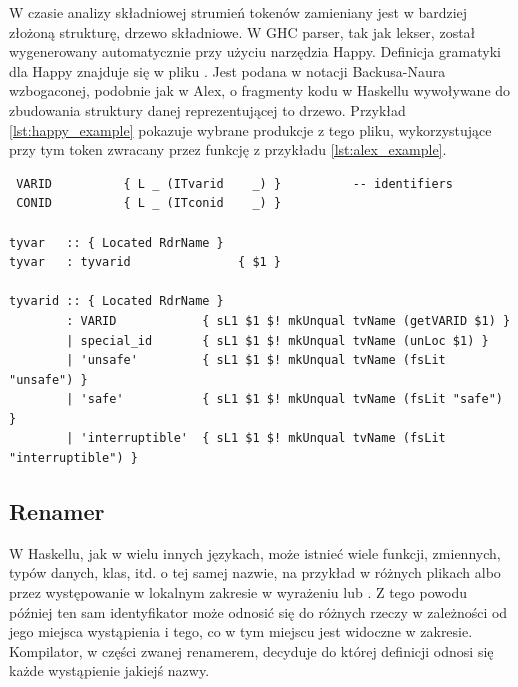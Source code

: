 W czasie analizy składniowej strumień tokenów zamieniany jest w bardziej złożoną
strukturę, drzewo składniowe. W GHC parser, tak jak lekser, został wygenerowany
automatycznie przy użyciu narzędzia Happy. Definicja gramatyki dla Happy
znajduje się w pliku . Jest podana w notacji Backusa-Naura
wzbogaconej, podobnie jak w Alex, o fragmenty kodu w Haskellu wywoływane do
zbudowania struktury danej reprezentującej to drzewo\cite{DocsHappy}. Przykład
\ref{lst:happy_example} pokazuje wybrane produkcje z tego pliku, wykorzystujące
przy tym token  zwracany przez funkcję  z przykładu
\ref{lst:alex_example}.
{
\begin{lstlisting}[float,label={lst:happy_example},
                   caption={Wycinki z pliku \code{Parser.y} z produkcjami odpowiadającymi za zmienne typów, wykorzystujące tokeny, których dotyczył przykład \ref{lst:alex_example}.}]
%token
 VARID          { L _ (ITvarid    _) }          -- identifiers
 CONID          { L _ (ITconid    _) }

tyvar   :: { Located RdrName }
tyvar   : tyvarid               { $1 }

tyvarid :: { Located RdrName }
        : VARID            { sL1 $1 $! mkUnqual tvName (getVARID $1) }
        | special_id       { sL1 $1 $! mkUnqual tvName (unLoc $1) }
        | 'unsafe'         { sL1 $1 $! mkUnqual tvName (fsLit "unsafe") }
        | 'safe'           { sL1 $1 $! mkUnqual tvName (fsLit "safe") }
        | 'interruptible'  { sL1 $1 $! mkUnqual tvName (fsLit "interruptible") }
\end{lstlisting}

\subsection{Renamer}\label{sec:renamer}

W Haskellu, jak w wielu innych językach, może istnieć wiele funkcji, zmiennych,
typów danych, klas, itd. o tej samej nazwie, na przykład w różnych plikach albo
przez występowanie w lokalnym zakresie w wyrażeniu  lub
. Z tego powodu później ten sam identyfikator może odnosić się do
różnych rzeczy w zależności od jego miejsca wystąpienia i tego, co w tym miejscu
jest widoczne w zakresie. Kompilator, w części zwanej renamerem, decyduje do
której definicji odnosi się każde wystąpienie jakiejś nazwy.

}
